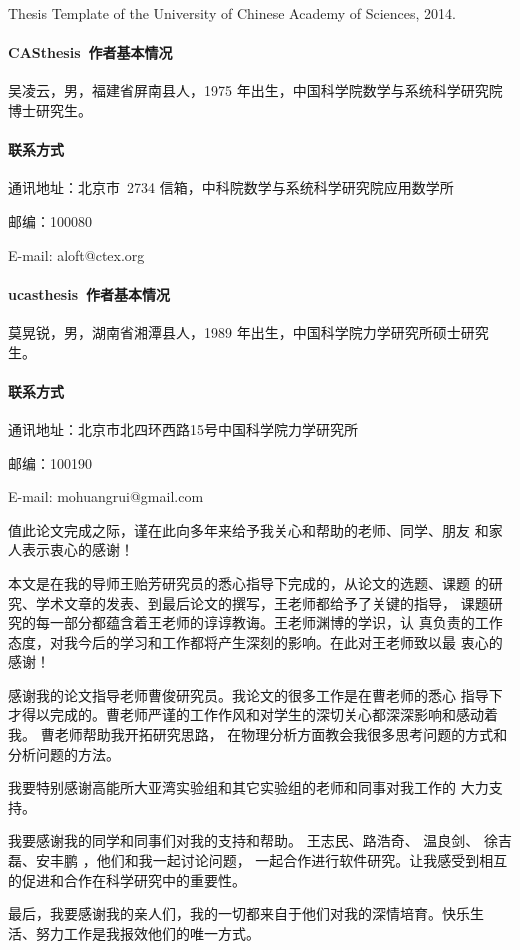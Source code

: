 \begin{publications}

Thesis Template of the University of Chinese Academy of Sciences, 2014.

\end{publications}

\begin{resume}

\paragraph{CASthesis~作者基本情况}
吴凌云，男，福建省屏南县人，1975 年出生，中国科学院数学与系统科学研究院博士研究生。

\paragraph{联系方式}
通讯地址：北京市~2734 信箱，中科院数学与系统科学研究院应用数学所

邮编：100080

E-mail: aloft@ctex.org

\paragraph{ucasthesis~作者基本情况}
莫晃锐，男，湖南省湘潭县人，1989 年出生，中国科学院力学研究所硕士研究生。

\paragraph{联系方式}
通讯地址：北京市北四环西路15号中国科学院力学研究所

邮编：100190

E-mail: mohuangrui@gmail.com

\end{resume}

\begin{thanks}
值此论文完成之际，谨在此向多年来给予我关心和帮助的老师、同学、朋友
和家人表示衷心的感谢！

本文是在我的导师王贻芳研究员的悉心指导下完成的，从论文的选题、课题
的研究、学术文章的发表、到最后论文的撰写，王老师都给予了关键的指导，
课题研究的每一部分都蕴含着王老师的谆谆教诲。王老师渊博的学识，认
真负责的工作态度，对我今后的学习和工作都将产生深刻的影响。在此对王老师致以最
衷心的感谢！

感谢我的论文指导老师曹俊研究员。我论文的很多工作是在曹老师的悉心
指导下才得以完成的。曹老师严谨的工作作风和对学生的深切关心都深深影响和感动着我。
曹老师帮助我开拓研究思路，
在物理分析方面教会我很多思考问题的方式和分析问题的方法。

我要特别感谢高能所大亚湾实验组和其它实验组的老师和同事对我工作的
大力支持。

我要感谢我的同学和同事们对我的支持和帮助。 王志民、路浩奇、 
温良剑、 徐吉磊、安丰鹏 ，他们和我一起讨论问题，
一起合作进行软件研究。让我感受到相互的促进和合作在科学研究中的重要性。


最后，我要感谢我的亲人们，我的一切都来自于他们对我的深情培育。快乐生
活、努力工作是我报效他们的唯一方式。

\end{thanks}
